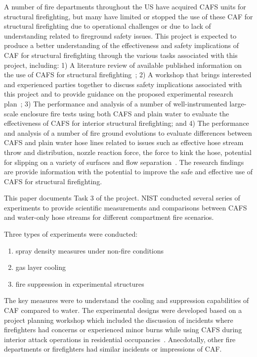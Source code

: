\documentclass[12pt,oneside]{book}
\begin{document}
A number of fire departments throughout the US have acquired CAFS units for structural firefighting, but many have limited or stopped the use of these CAF for structural firefighting due to operational challenges or due to lack of understanding related to fireground safety issues. This project is expected to produce a better understanding of the effectiveness and safety implications of CAF for structural firefighting through the various tasks associated with this project, including: 1) A literature review of available published information on the use of CAFS for structural firefighting~\cite{Mitchell:1}; 2) A workshop that brings interested and experienced parties together to discuss safety implications associated with this project and to provide guidance on the proposed experimental research plan~\cite{Grant:2011}; 3) The performance and analysis of a number of well-instrumented large-scale enclosure fire tests using both CAFS and plain water to evaluate the effectiveness of CAFS for interior structural firefighting; and 4) The performance and analysis of a number of fire ground evolutions to evaluate differences between CAFS and plain water hose lines related to issues such as effective hose stream throw and distribution, nozzle reaction force, the force to kink the hose, potential for slipping on a variety of surfaces and flow separation~\cite{Carracino:2013,Dicus:2012,LaPolla:2012}. The research findings are provide information with the potential to improve the safe and effective use of CAFS for structural firefighting.

This paper documents Task 3 of the project. NIST conducted several series of experiments to provide scientific measurements and comparisons between CAFS and water-only hose streams for different compartment fire scenarios.

Three types of experiments were conducted:
\begin{enumerate}
\item spray density measures under non-fire conditions
\item gas layer cooling
\item fire suppression in experimental structures
\end{enumerate}

The key measures were to understand the cooling and suppression capabilities of CAF compared to water. The experimental designs were developed based on a project planning workshop which included the discussion of incidents where firefighters had concerns or experienced minor burns while using CAFS during interior attack operations in residential occupancies~\cite{Grant:2011}. Anecdotally, other fire departments or firefighters had similar incidents or impressions of CAF.
\end{document}
